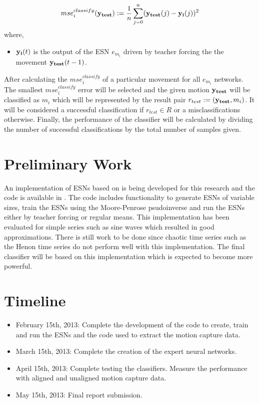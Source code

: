 \documentclass[10pt]{article}
\begin{document}
\[
mse_i^{classify}({\bf y_{test}}):=\frac{1}{n}\sum_{j=0}^{n}({\bf y_{test}}(j) - {\bf y_i}(j))^2
\]
where, 
\begin{itemize}
  \item ${\bf y_i}(t)$ is the output of the ESN $e_{m_i}$ driven by teacher forcing the the movement ${\bf y_{test}}(t-1)$. 
\end{itemize}
After calculating the $mse_{i}^{classify}$ of a particular movement for all $e_{m_i}$ networks. The smallest $mse_{i}^{classify}$ error will be selected and the given motion ${\bf y_{test}}$ will be classified as $m_i$ which will be represented by the result pair $r_{test}:=({\bf y_{test}},m_i)$. It will be considered a successful classification if $r_{test}\in R$ or a misclassifications otherwise. Finally, the performance of the classifier will be calculated by dividing the number of successful classifications by the total number of samples given.

\section{Preliminary Work}
An implementation of ESNs based on \cite{JaegerESNTutorial} is being developed for this research and the code is available in \cite{LambdaNN}. The code includes functionality to generate ESNs of variable sizes, train the ESNs using the Moore-Penrose psudoinverse and run the ESNs either by teacher forcing or regular means. This implementation has been evaluated for simple series such as sine waves which resulted in good approximations. There is still work to be done since chaotic time series such as the Henon time series do not perform well with this implementation. The final classifier will be based on this implementation which is expected to become more powerful.

\section{Timeline}
\begin{itemize}
  \item February 15th, 2013: Complete the development of the code to create, train and run the ESNs and the code used to extract the motion capture data.
  \item March 15th, 2013: Complete the creation of the expert neural networks. 
  \item April 15th, 2013: Complete testing the classifiers. Measure the performance with aligned and unaligned motion capture data.
  \item May 15th, 2013: Final report submission.
\end{itemize}



\end{document}
